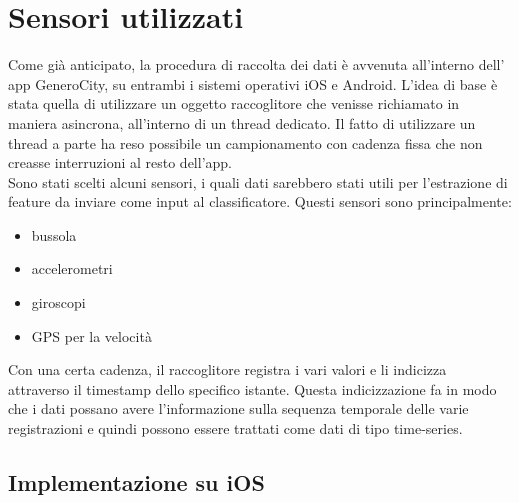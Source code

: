 \section{Sensori utilizzati} 

Come già anticipato, la procedura di raccolta dei dati è avvenuta all'interno dell'
app GeneroCity, su entrambi i sistemi operativi iOS e Android. L'idea di base è stata
quella di utilizzare un oggetto raccoglitore che venisse richiamato in maniera
asincrona, all'interno di un thread dedicato. Il fatto di utilizzare un thread a parte
ha reso possibile un campionamento con cadenza fissa che non creasse interruzioni al
resto dell'app.\\
Sono stati scelti alcuni sensori, i quali dati sarebbero stati utili per l'estrazione
di feature da inviare come input al classificatore. Questi sensori sono principalmente:
\begin{itemize}
    \item bussola
    \item accelerometri \cite{activity_recognition_accelerometer}
    \item giroscopi
    \item GPS per la velocità
\end{itemize}
Con una certa cadenza, il raccoglitore registra i vari valori e li indicizza
attraverso il timestamp dello specifico istante. Questa indicizzazione fa in modo
che i dati possano avere l'informazione sulla sequenza temporale delle varie
registrazioni e quindi possono essere trattati come dati di tipo time-series.

\subsection{Implementazione su iOS}

